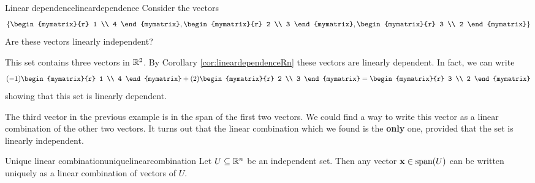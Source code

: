 \begin{example}{Linear dependence}{lineardependence}
Consider the vectors 
\[
\set{\begin{mymatrix}{r}
1 \\
4 
\end{mymatrix}, 
\begin{mymatrix}{r}
2 \\
3
\end{mymatrix}, 
\begin{mymatrix}{r}
3 \\
2
\end{mymatrix} }
\]
Are these vectors linearly independent?
\end{example}

\begin{solution}
This set contains three vectors in $\mathbb{R}^2$. By Corollary \ref{cor:lineardependenceRn} these vectors are linearly dependent.
In fact, we can write
\[
(-1) \begin{mymatrix}{r}
1 \\
4 
\end{mymatrix} + (2) 
\begin{mymatrix}{r}
2 \\
3
\end{mymatrix} = 
\begin{mymatrix}{r}
3 \\
2
\end{mymatrix}
\]
showing that this set is linearly dependent. 
\end{solution}

The third vector in the previous example is in the span of the first two vectors. We could find a way to write this vector as a linear combination of the other two vectors. It turns out that the linear combination which we found is the \textbf{only} one, provided that the set is linearly independent. 

\begin{theorem}{Unique linear combination}{uniquelinearcombination}
Let $U \subseteq\mathbb{R}^n$ be an independent set.
Then any vector ${\bf x}\in\mbox{span}(U)$ can be written uniquely as a linear combination of vectors of $U$.
\end{theorem}

